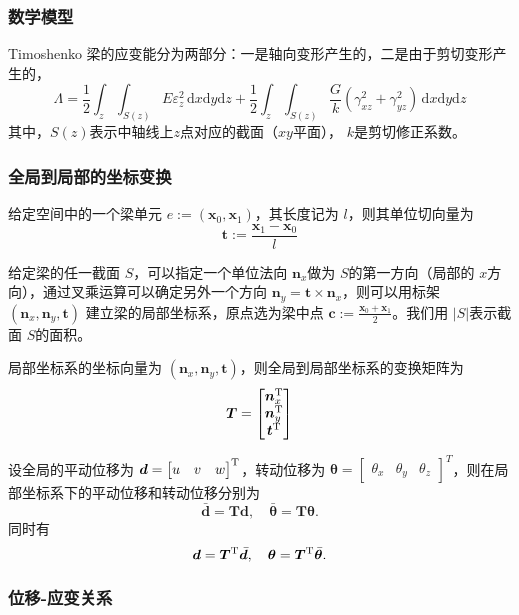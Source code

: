 \documentclass{article}
\begin{document}
\subsubsection{数学模型}
Timoshenko 梁的应变能分为两部分：一是轴向变形产生的，二是由于剪切变形产生的，
$$\Lambda= \frac{1}{2}\int_z\int_{S(z)}E\varepsilon_z^2\,\mathrm{d}x\mathrm{d}y\mathrm{d}z+\frac{1}{2}
\int_z\int_{S(z)}\frac{G}{k}(\gamma_{xz}^2 + \gamma_{yz}^2)\,\mathrm{d}x\mathrm{d}y\mathrm{d}z$$
其中，$S(z)$表示中轴线上$z$点对应的截面（$xy$平面）， $k$是剪切修正系数。

\subsubsection{全局到局部的坐标变换}
给定空间中的一个梁单元 $e :=(\bm{x}_0, \bm{x}_1)$，其长度记为 $l$，则其单位切向量为
 $$\bm{t}:=\frac{\bm{x}_1-\bm{x}_0}{l}$$

给定梁的任一截面 $S$，可以指定一个单位法向 $\bm{n}_x$做为 $S$的第一方向（局部的 $x$方向），通过叉乘运算可以确定另外一个方向 $\bm{n}_y = \bm{t}\times \bm{n}_x$，则可以用标架 $(\bm{n}_x, \bm{n}_y, \bm{t})$ 建立梁的局部坐标系，原点选为梁中点 $\bm{c} := \frac{\bm{x}_0 + \bm{x}_1}{2}$。我们用 $|S|$表示截面 $S$的面积。

局部坐标系的坐标向量为 $(\bm{n}_x, \bm{n}_y, \bm{t})$，则全局到局部坐标系的变换矩阵为
$$\bm{T} = 
\begin{bmatrix}
\bm{n}_x^{\rm T} \\
\bm{n}_y^{\rm T} \\
\bm{t}^{\rm T}
\end{bmatrix}$$

设全局的平动位移为 $\bm{d} = \begin{bmatrix}
u & v & w
\end{bmatrix}^{\rm T}$，转动位移为 $\bm{\theta}=\begin{bmatrix}
\theta_x & \theta_y & \theta_z
\end{bmatrix}^T$，则在局部坐标系下的平动位移和转动位移分别为
$$\bar{\bm{d}}=\bm{T}\bm{d},\quad \bar{\bm{\theta}}=\bm{T}\bm{\theta}.$$
同时有
$$\bm{d}=\bm{T}^{\rm T}\bar{\bm{d}},\quad \bm{\theta}=\bm{T}^{\rm T}\bar{\bm{\theta}}.$$

\subsubsection{位移-应变关系}
\end{document}
